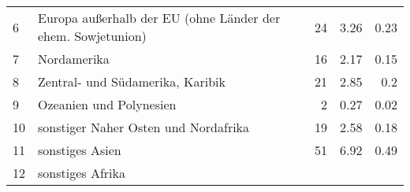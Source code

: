 \begin{longtable}{lXrrr}
     6 &
     \multicolumn{1}{X}{ Europa außerhalb der EU (ohne Länder der ehem. Sowjetunion)   } &


       \num{24} &
       \num[round-mode=places,round-precision=2]{3.26} &
         \num[round-mode=places,round-precision=2]{0.23} \\

     7 &
     \multicolumn{1}{X}{ Nordamerika   } &


       \num{16} &
       \num[round-mode=places,round-precision=2]{2.17} &
         \num[round-mode=places,round-precision=2]{0.15} \\

     8 &
     \multicolumn{1}{X}{ Zentral- und Südamerika, Karibik   } &


       \num{21} &
       \num[round-mode=places,round-precision=2]{2.85} &
         \num[round-mode=places,round-precision=2]{0.2} \\

     9 &
     \multicolumn{1}{X}{ Ozeanien und Polynesien   } &


       \num{2} &
       \num[round-mode=places,round-precision=2]{0.27} &
         \num[round-mode=places,round-precision=2]{0.02} \\

     10 &
     \multicolumn{1}{X}{ sonstiger Naher Osten und Nordafrika   } &


       \num{19} &
       \num[round-mode=places,round-precision=2]{2.58} &
         \num[round-mode=places,round-precision=2]{0.18} \\

     11 &
     \multicolumn{1}{X}{ sonstiges Asien   } &


       \num{51} &
       \num[round-mode=places,round-precision=2]{6.92} &
         \num[round-mode=places,round-precision=2]{0.49} \\

     12 &
     \multicolumn{1}{X}{ sonstiges Afrika   } &



\end{longtable}
